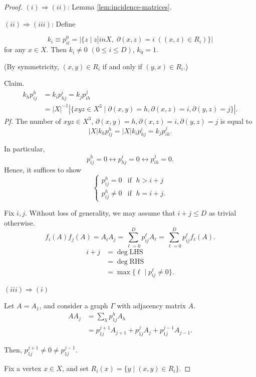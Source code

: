 \documentclass[
]{book}
\theoremstyle{definition}
\theoremstyle{definition}
\theoremstyle{definition}
\theoremstyle{definition}
\theoremstyle{remark}
\begin{document}
\begin{proof}
\leavevmode

\((i)\Rightarrow (ii)\): Lemma \ref{lem:incidence-matrices}.

\((ii)\Rightarrow (iii)\): Define

\[k_i \equiv p^0_{ii} = |\{z\mid z]in X, \; \partial(x,z) = i \; ((x,z)\in R_i)\}|\]
for any \(x\in X\).
Then \(k_i \neq 0\) \((0\leq i\leq D)\), \(k_0 = 1\).

(By symmetricity, \((x,y)\in R_i\) if and only if \((y,x)\in R_i\).)

Claim.
\begin{align}
k_hp^h_{ij} & = k_ip^i_{hj} = k_jp^j_{ih}\\
& = |X|^{-1}|\{xyz\in X^3\mid \partial(x,y) = h, \partial(x,z) = i, \partial(y,z) = j\}|.
\end{align}
\emph{Pf.}
The number of \(xyz\in X^3\), \(\partial(x,y) = h, \partial(x,z) = i, \partial(y,z) = j\) is equal to
\[|X|k_hp^h_{ij} = |X|k_ip^i_{hj} = k_jp^j_{ih}.\]

In particular,
\[p^h_{ij} = 0 \leftrightarrow p^i_{hj} =0 \leftrightarrow p^j_{ih} = 0.\]
Hence, it suffices to show
\[\begin{cases}
p^h_{ij} = 0 & \text{if }\; h > i+j\\
p^h_{ij} \neq 0 & \text{if }\; h = i+j.
\end{cases}\]

Fix \(i,j\). Without loss of generality, we may assume that \(i+j\leq D\) as trivial otherwise.
\[f_i(A)f_j(A) = A_iA_j = \sum_{\ell = 0}^Dp^{\ell}_{ij}A_\ell = \sum_{\ell=0}^Dp^\ell_{ij}f_\ell(A).\]
\begin{align}
i + j & = \deg \mathrm{LHS}\\
& = \deg \mathrm{RHS}\\
& = \max\{\ell\mid p^\ell_{ij}\neq 0\}.
\end{align}

\((iii)\Rightarrow (i)\)

Let \(A = A_1\), and consider a graph \(\Gamma\) with adjacency matrix \(A\).
\begin{align}
AA_j & = \sum_{h}p^h_{1j}A_h\\
& = p^{j+1}_{1j} A_{j+1} + p^j_{1j}A_j + p^{j-1}_{1j}A_{j-1}.
\end{align}

Then, \(p^{j+1}_{1j} \neq 0 \neq p^{j-1}_{1j}\).

Fix a vertex \(x\in X\), and set \(R_i(x) = \{y\mid (x,y)\in R_i\}\).


\end{proof}
\end{document}
